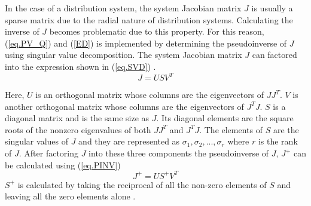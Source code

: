 In the case of a distribution system, the system Jacobian matrix $J$ is usually a sparse matrix due to the radial nature of distribution systems. Calculating the inverse of $J$ becomes problematic due to this property. For this reason, (\ref{eq.PV_Q}) and (\ref{ED}) is implemented by determining the pseudoinverse of $J$ using singular value decomposition. The system Jacobian matrix $J$ can factored into the expression shown in (\ref{eq.SVD}) \cite{PINV}.
\begin{equation}\label{eq.SVD}
    J = USV^T
\end{equation}

Here, $U$ is an orthogonal matrix whose columns are the eigenvectors of $JJ^T$. $V$ is another orthogonal matrix whose columns are the eigenvectors of $J^{T}J$. $S$ is a diagonal matrix and is the same size as $J$. Its diagonal elements are the square roots of the nonzero eigenvalues of both $JJ^T$ and $J^{T}J$. The elements of $S$ are the singular values of $J$ and they are represented as $\sigma_1, \sigma_2, ..., \sigma_r$ where $r$ is the rank of $J$. After factoring $J$ into these three components the pseudoinverse of $J$, $J^+$ can be calculated using (\ref{eq.PINV}) \cite{PINV}
\begin{equation}\label{eq.PINV}
    J^+ = US^{+}V^T
\end{equation}
$S^+$ is calculated by taking the reciprocal of all the non-zero elements of $S$ and leaving all the zero elements alone \cite{PINV}.  